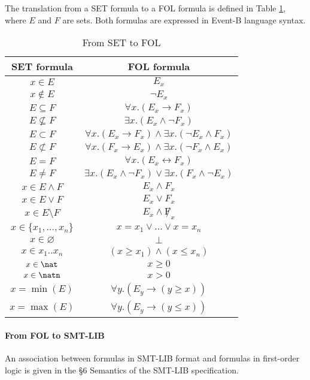 The translation from a SET formula to a FOL formula is defined in Table \ref{SET2FOL}, where $E$ and $F$ are sets. Both formulas are expressed in Event-B language syntax. 
\begin{table}[htbp]
\begin{center}
\begin{tabular}{|c|c|}
 \hline
 \textbf{SET formula} & \textbf{FOL formula} \\ 
 \hline
 $x \in E$ & $E_x$ \\ 
 $x \notin E$ & $\neg E_x$ \\
 $E \subseteq F$ & $\forall{x}.(E_x \rightarrow F_x)$ \\ 
 $E \nsubseteq F$ & $\exists{x}.(E_x \wedge \neg F_x)$ \\ 
 $E \subset F$ & $\forall{x}.(E_x \rightarrow F_x) \wedge \exists{x}.(\neg E_x \wedge F_x)$ \\ 
 $E \not\subset F$ & $\forall{x}.(F_x \rightarrow E_x) \wedge \exists{x}.(\neg F_x \wedge E_x)$ \\ 
 $E = F$ & $\forall{x}.(E_x \leftrightarrow F_x)$ \\ 
 $E \neq F$ & $\exists{x}.(E_x \wedge \neg F_x) \vee \exists{x}.(F_x \wedge \neg E_x)$ \\ 
 $x \in E \wedge F$ & $E_x \wedge F_x$ \\ 
 $x \in E \vee F$ & $E_x \vee F_x$ \\ 
 $x \in E \setminus F$ & $E_x \wedge \not F_x$ \\
 $x \in \{x_1, ..., x_n\}$ & $x = x_1 \vee ... \vee x = x_n$ \\
 $x \in \varnothing$ & $\perp$ \\
 $x \in x_1 .. x_n$ & $(x \geqslant x_1) \wedge (x \leqslant x_n)$ \\
 $x \in \nat$ & $x \geqslant 0$ \\
 $x \in \natn$ & $x > 0$ \\
 $x = \min(E)$ & $\forall{y}.(E_y \rightarrow (y \geqslant x))$ \\
 $x = \max(E)$ & $\forall{y}.(E_y \rightarrow (y \leqslant x))$ \\
 \hline
\end{tabular} 
\end{center}
\caption{From SET to FOL}
\label{SET2FOL}
\end{table}

\paragraph{From FOL to SMT-LIB}
An association between formulas in SMT-LIB format and formulas in first-order logic is given in the \S6 Semantics of the SMT-LIB specification\cite{SMTLIB06}.

